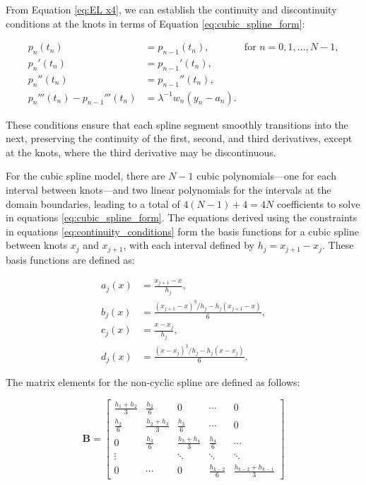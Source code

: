 \documentclass[
11pt, %
oneside, %
english, %
singlespacing, %
]{macthesis} %
\begin{document}
From Equation \ref{eq:EL x4}, we can establish the continuity and discontinuity conditions at the knots in terms of Equation \ref{eq:cubic_spline_form}:

\begin{equation}
\begin{aligned}
p_n(t_n) &= p_{n-1}(t_n), & \text{for } n = 0, 1, \ldots, N-1, \\
p_n'(t_n) &= p_{n-1}'(t_n), \\
p_n''(t_n) &= p_{n-1}''(t_n), \\
p_n'''(t_n) - p_{n-1}'''(t_n) &= \lambda^{-1} w_n (y_n - a_n).
\end{aligned}
\label{eq:continuity_conditions}
\end{equation}

These conditions ensure that each spline segment smoothly transitions into the next, preserving the continuity of the first, second, and third derivatives, except at the knots, where the third derivative may be discontinuous.

For the cubic spline model, there are \(N-1\) cubic polynomials---one for each interval between knots---and two linear polynomials for the intervals at the domain boundaries, leading to a total of \(4(N-1) + 4 = 4N\) coefficients to solve in equations \ref{eq:cubic_spline_form}. The equations derived using the constraints in equations \ref{eq:continuity_conditions} form the basis functions for a cubic spline between knots \(x_j\) and \(x_{j+1}\), with each interval defined by \(h_j = x_{j+1} - x_j\). These basis functions are defined as:

\begin{equation}
\begin{aligned}
a_{j}(x) &= \frac{x_{j+1} - x}{h_j}, \\
b_{j}(x) &= \frac{(x_{j+1} - x)^3 / h_j - h_j (x_{j+1} - x)}{6}, \\
c_{j}(x) &= \frac{x - x_j}{h_j}, \\
d_{j}(x) &= \frac{(x - x_j)^3 / h_j - h_j (x - x_j)}{6}.
\end{aligned}
\label{eq:spline_basis_functions}
\end{equation}

The matrix elements for the non-cyclic spline are defined as follows:

\begin{equation}
\mathbf{B} = 
\begin{bmatrix}
\frac{h_1 + h_2}{3} & \frac{h_2}{6} & 0 & \cdots & 0 \\
\frac{h_2}{6} & \frac{h_2 + h_3}{3} & \frac{h_3}{6} & \cdots & 0 \\
0 & \frac{h_3}{6} & \frac{h_3 + h_4}{3} & \frac{h_4}{6} & \cdots \\
\vdots & & \ddots & \ddots & \ddots \\
0 & \cdots & 0 & \frac{h_{k-2}}{6} & \frac{h_{k-2} + h_{k-1}}{3}
\end{bmatrix}
\label{eq: spline_matrix_element_B}
\end{equation}
\end{document}
